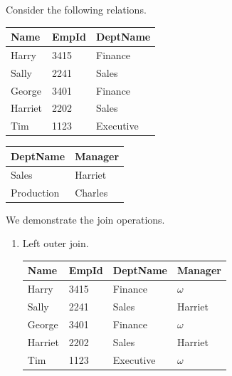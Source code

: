     \begin{example}
      Consider the following relations. 

      \begin{center}
        \begin{minipage}{0.5\textwidth}
          \centering
          \begin{tabular}{|l|l|l|}
          \hline
          Name & EmpId & DeptName \\
          \hline
          Harry & 3415 & Finance \\
          Sally & 2241 & Sales \\
          George & 3401 & Finance \\
          Harriet & 2202 & Sales \\
          Tim & 1123 & Executive \\
          \hline
          \end{tabular}
        \end{minipage}%
        \begin{minipage}{0.5\textwidth}
          \centering
          \begin{tabular}{|l|l|}
          \hline
          DeptName & Manager \\
          \hline
          Sales & Harriet \\
          Production & Charles \\
          \hline
          \end{tabular}
        \end{minipage}
      \end{center}

      We demonstrate the join operations. 
      \begin{enumerate}
        \item Left outer join. 
        \begin{center}
          \begin{tabular}{|l|l|l|l|}
          \hline
          Name & EmpId & DeptName & Manager \\
          \hline
          Harry & 3415 & Finance & $\omega$ \\
          Sally & 2241 & Sales & Harriet \\
          George & 3401 & Finance & $\omega$ \\
          Harriet & 2202 & Sales & Harriet \\
          Tim & 1123 & Executive & $\omega$ \\
          \hline
          \end{tabular}
        \end{center}


\end{enumerate}
\end{example}
